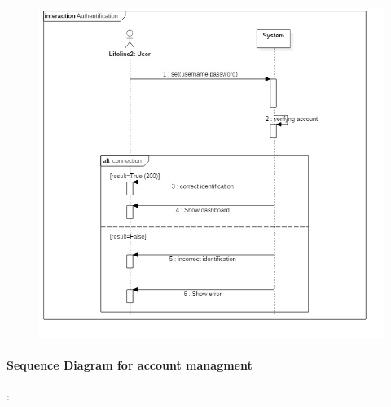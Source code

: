  \begin{figure}[H]
	\centering
	\includegraphics[height=0.7\textheight]{fig01/SequenceDiagramAuthentification}
	\label{fig:FilialesEtClients}
\end{figure}

\paragraph{Sequence Diagram for account managment} :
\label{sec:sec01}

